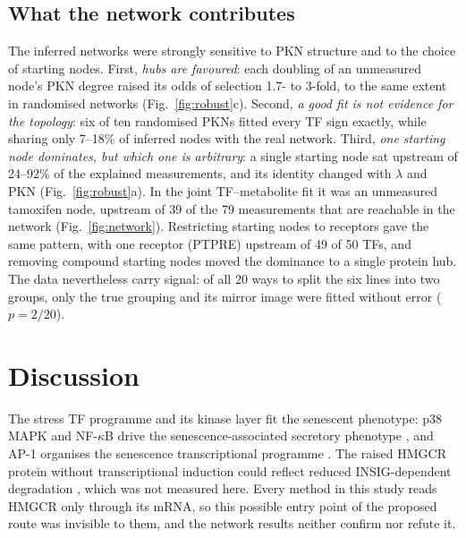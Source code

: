 \documentclass[11pt, a4paper]{article}
\begin{document}
\subsection{What the network contributes}
The inferred networks were strongly sensitive to PKN structure and to the choice of starting
nodes. First,
\emph{hubs are favoured}: each doubling of an unmeasured node's PKN degree raised its odds of
selection 1.7- to 3-fold, to the same extent in randomised networks (Fig.~\ref{fig:robust}c).
Second, \emph{a good fit is not evidence for the topology}: six of ten randomised PKNs fitted every
TF sign exactly, while sharing only 7--18\% of inferred nodes with the real network. Third,
\emph{one starting node dominates, but which one is arbitrary}: a single starting node sat upstream
of 24--92\% of the explained measurements, and its identity changed with $\lambda$ and PKN
(Fig.~\ref{fig:robust}a). In the joint TF--metabolite fit it was an unmeasured tamoxifen node,
upstream of 39 of the 79 measurements that are reachable in the network (Fig.~\ref{fig:network}).
Restricting starting nodes to receptors gave the same pattern, with one receptor (PTPRE) upstream
of 49 of 50 TFs, and removing compound starting nodes moved the dominance to a single protein hub.
The data nevertheless carry signal: of all 20 ways to split the six lines into two groups, only the
true grouping and its mirror image were fitted without error ($p=2/20$).

\section{Discussion}

The stress TF programme and its kinase layer fit the senescent phenotype: p38 MAPK and NF-$\kappa$B
drive the senescence-associated secretory phenotype \cite{freund2011p38,chien2011nfkb}, and AP-1
organises the senescence transcriptional programme \cite{martinezzamudio2020ap1}. The raised HMGCR
protein without transcriptional induction could reflect reduced INSIG-dependent degradation
\cite{deboseboyd2008feedback}, which was not measured here. Every method in this study reads HMGCR only
through its mRNA, so this possible entry point of the proposed route was invisible to them, and the
network results neither confirm nor refute it.
\end{document}
